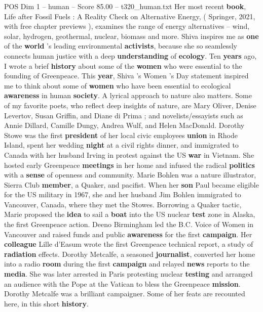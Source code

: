 \begin{textsample}{POS Dim 1 – human – Score 85.00 – t320\_human.txt}
Her most recent \textbf{book}, Life after Fossil Fuels : A Reality Check on Alternative Energy, ( Springer, 2021, with free chapter previews ), examines the range of energy alternatives – wind, solar, hydrogen, geothermal, nuclear, biomass and more.
Shiva inspires me as \textbf{one} of the \textbf{world} ’s leading environmental \textbf{activists}, because she so seamlessly connects human justice with a deep \textbf{understanding} of \textbf{ecology}.
Ten \textbf{years} ago, I wrote a brief \textbf{history} about some of the \textbf{women} who were essential to the founding of Greenpeace.
This \textbf{year}, Shiva ’s Women ’s Day statement inspired me to think about some of \textbf{women} who have been essential to ecological \textbf{awareness} in human \textbf{society}.
A lyrical approach to nature also matters.
Some of my favorite poets, who reflect deep insights of nature, are Mary Oliver, Denise Levertov, Susan Griffin, and Diane di Prima ; and novelists/essayists such as Annie Dillard, Camille Dungy, Andrea Wulf, and Helen MacDonald.
Dorothy Stowe was the first \textbf{president} of her local civic employees \textbf{union} in Rhode Island, spent her wedding \textbf{night} at a civil rights dinner, and immigrated to Canada with her husband Irving in protest against the US \textbf{war} in Vietnam.
She hosted early Greenpeace \textbf{meetings} in her home and infused the radical \textbf{politics} with a \textbf{sense} of openness and community.
Marie Bohlen was a nature illustrator, Sierra Club \textbf{member}, a Quaker, and pacifist.
When her \textbf{son} Paul became eligible for the US military in 1967, she and her husband Jim Bohlen immigrated to Vancouver, Canada, where they met the Stowes.
Borrowing a Quaker tactic, Marie proposed the \textbf{idea} to sail a \textbf{boat} into the US nuclear \textbf{test} zone in Alaska, the first Greenpeace action.
Deeno Birmingham led the B.C.
Voice of Women in Vancouver and raised funds and public \textbf{awareness} for the first \textbf{campaign}.
Her \textbf{colleague} Lille d’Easum wrote the first Greenpeace technical report, a study of \textbf{radiation} effects.
Dorothy Metcalfe, a seasoned \textbf{journalist}, converted her home into a radio \textbf{room} during the first \textbf{campaign} and relayed \textbf{news} reports to the \textbf{media}.
She was later arrested in Paris protesting nuclear \textbf{testing} and arranged an audience with the Pope at the Vatican to bless the Greenpeace \textbf{mission}.
Dorothy Metcalfe was a brilliant campaigner.
Some of her feats are recounted here, in this short \textbf{history}.

\end{textsample}
